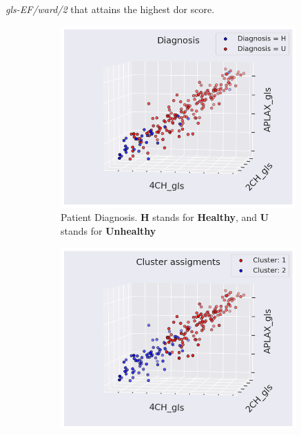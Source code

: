 \textit{gls-EF/ward/2} that attains the highest \acrshort{dor} score.

\begin{figure}[H]
    \centering
    \begin{subfigure}[b]{0.49\textwidth}
        \centering
        \includegraphics[width=0.99\textwidth]{results/pd/scatter_gls_indication_bin.png}
        \caption{Patient Diagnosis. \textbf{H} stands for \textbf{Healthy}, and \textbf{U} stands for \textbf{Unhealthy}}
        \label{fig:scatter_gls_pd}
    \end{subfigure}
    \begin{subfigure}[b]{0.49\textwidth}
        \centering
        \includegraphics[width=0.99\textwidth]{results/pd/scatter_gls_EF_ward2.png}

\end{subfigure}
\end{figure}
